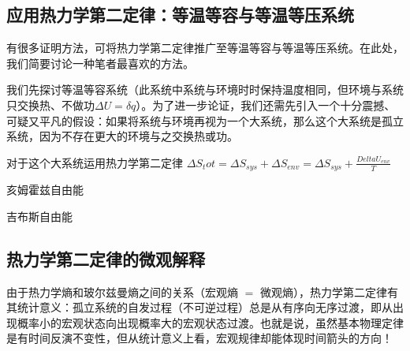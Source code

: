 \subsection{应用热力学第二定律：等温等容与等温等压系统}
有很多证明方法，可将热力学第二定律推广至等温等容与等温等压系统。在此处，我们简要讨论一种笔者最喜欢的方法。

我们先探讨等温等容系统（此系统中系统与环境时时保持温度相同，但环境与系统只交换热、不做功$\Delta U = \delta q$）。为了进一步论证，我们还需先引入一个十分震撼、可疑又平凡的假设：如果将系统与环境再视为一个大系统，那么这个大系统是孤立系统，因为不存在更大的环境与之交换热或功。

对于这个大系统运用热力学第二定律 $\Delta {S_tot} =\Delta {S_{sys}}+\Delta {S_{env}} =\Delta {S_{sys}}+ \frac{Delta U_{{env}}}{T}    $


亥姆霍兹自由能

吉布斯自由能

\subsection{热力学第二定律的微观解释}
由于热力学熵和玻尔兹曼熵之间的关系（宏观熵 $=$ 微观熵），热力学第二定律有其统计意义：孤立系统的自发过程（不可逆过程）总是从有序向无序过渡，即从出现概率小的宏观状态向出现概率大的宏观状态过渡。也就是说，虽然基本物理定律是有时间反演不变性，但从统计意义上看，宏观规律却能体现时间箭头的方向！
